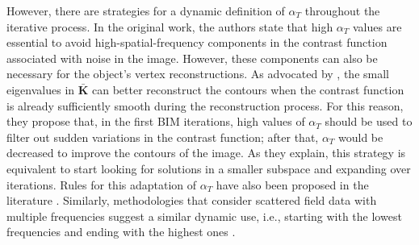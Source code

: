 			However, there are strategies for a dynamic definition of $\alpha_T$ throughout the iterative process. In the original work, the authors state that high $\alpha_T$ values are essential to avoid high-spatial-frequency components in the contrast function associated with noise in the image. However, these components can also be necessary for the object's vertex reconstructions. As advocated by \cite{moghaddam1992nonlinear}, the small eigenvalues in $\mathbf{\bar{K}}$ can better reconstruct the contours when the contrast function is already sufficiently smooth during the reconstruction process. For this reason, they propose that, in the first BIM iterations, high values of $\alpha_T$ should be used to filter out sudden variations in the contrast function; after that, $\alpha_T$ would be decreased to improve the contours of the image. As they explain, this strategy is equivalent to start looking for solutions in a smaller subspace and expanding over iterations. Rules for this adaptation of $\alpha_T$ have also been proposed in the literature \citep{lavarello2008study,joachimowicz1991inverse,franchois1997microwave,zaiping2000variational}. Similarly, methodologies that consider scattered field data with multiple frequencies suggest a similar dynamic use, i.e., starting with the lowest frequencies and ending with the highest ones \citep{chew1995frequency,batista2021quadratic}.
							

